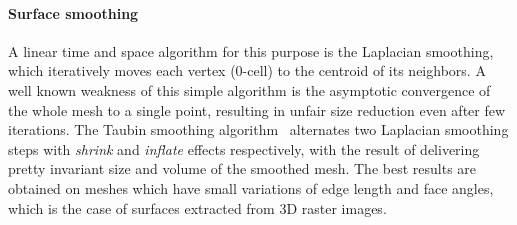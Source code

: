 \paragraph{Surface smoothing}
A linear time and space algorithm for this purpose is the Laplacian smoothing, which iteratively  moves each vertex (0-cell) to the centroid of its neighbors. A well known weakness of this simple algorithm is the asymptotic convergence of the whole mesh to a single point, resulting in unfair size reduction even after few iterations.  The Taubin smoothing algorithm~\cite{Taubin:1995:SPA:218380.218473,egst.20001029} alternates two Laplacian smoothing steps with \emph{shrink} and \emph{inflate} effects respectively, with the result of delivering pretty invariant size and volume of the smoothed mesh. The best results are obtained on meshes which have small variations of edge length and face angles, which is the case of surfaces extracted from 3D raster images.
 

